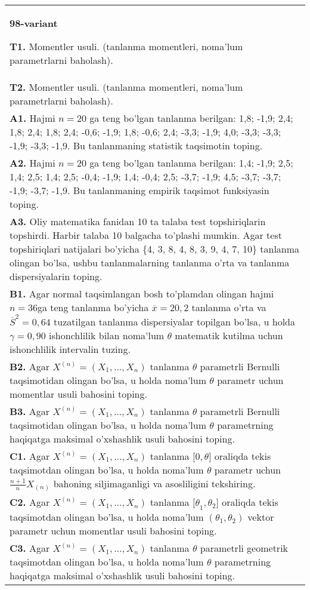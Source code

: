 \documentclass{article}
\begin{document}
\begin{tabular}{m{17cm}}
\textbf{98-variant}
\newline

\textbf{T1.} 
Momentler usuli. (tanlanma momentleri, noma'lum parametrlarni baholash).
\\
\textbf{T2.} 
Momentler usuli. (tanlanma momentleri, noma'lum parametrlarni baholash).
\\
\textbf{A1.} 
Hajmi \(n = 20\) ga teng bo'lgan tanlanma berilgan: 1,8; -1,9; 2,4; 1,8; 2,4; 1,8; 2,4; -0,6; -1,9; 1,8; -0,6; 2,4; -3,3; -1,9; 4,0; -3,3; -3,3; -1,9; -3,3; -1,9. Bu tanlanmaning statistik taqsimotin toping.
\\
\textbf{A2.} 
Hajmi \(n = 20\) ga teng bo'lgan tanlanma berilgan: 1,4; -1,9; 2,5; 1,4; 2,5; 1,4; 2,5; -0,4; -1,9; 1,4; -0,4; 2,5; -3,7; -1,9; 4,5; -3,7; -3,7; -1,9; -3,7; -1,9. Bu tanlanmaning empirik taqsimot funksiyasin toping.
\\
\textbf{A3.} 
Oliy matematika fanidan 10 ta talaba test topshiriqlarin topshirdi. Harbir talaba 10 balgacha to'plashi mumkin. Agar test topshiriqlari natijalari bo'yicha \{4, 3, 8, 4, 8, 3, 9, 4, 7, 10\} tanlanma olingan bo'lsa, ushbu tanlanmalarning tanlanma o'rta va tanlanma dispersiyalarin toping.
\\
\textbf{B1.} 
Agar normal taqsimlangan bosh to'plamdan olingan hajmi \(n = 36\)ga teng tanlanma bo'yicha \(\overline{x} = 20,2\) tanlanma o'rta va \({\overline{S}}^{2} = 0,64\) tuzatilgan tanlanma dispersiyalar topilgan bo'lsa, u holda \(\gamma = 0,90\) ishonchlilik bilan noma'lum \(\theta\) matematik kutilma uchun ishonchlilik intervalin tuzing.
\\
\textbf{B2.} 
Agar \(X^{(n)} = \left( X_{1},...,X_{n} \right)\) tanlanma \(\theta\) parametrli Bernulli taqsimotidan olingan bo'lsa, u holda noma'lum \(\theta\) parametr uchun momentlar usuli bahosini toping.
\\
\textbf{B3.} 
Agar \(X^{(n)} = \left( X_{1},...,X_{n} \right)\) tanlanma \(\theta\) parametrli Bernulli taqsimotidan olingan bo'lsa, u holda noma'lum \(\theta\) parametrning haqiqatga maksimal o'xshashlik usuli bahosini toping.
\\
\textbf{C1.} 
Agar \(X^{(n)} = \left( X_{1},...,X_{n} \right)\) tanlanma \(\lbrack 0,\theta\rbrack\) oraliqda tekis taqsimotdan olingan bo'lsa, u holda noma'lum \(\theta\) parametr uchun \(\frac{n + 1}{n}X_{(n)}\) bahoning siljimaganligi va asosliligini tekshiring.
\\
\textbf{C2.} 
Agar \(X^{(n)} = \left( X_{1},...,X_{n} \right)\) tanlanma \({\lbrack\theta}_{1},\theta_{2}\rbrack\) oraliqda tekis taqsimotdan olingan bo'lsa, u holda noma'lum \(\left( \theta_{1},\theta_{2} \right)\) vektor parametr uchun momentlar usuli bahosini toping.
\\
\textbf{C3.} 
Agar \(X^{(n)} = \left( X_{1},...,X_{n} \right)\) tanlanma \(\theta\) parametrli geometrik taqsimotdan olingan bo'lsa, u holda noma'lum \(\theta\) parametrning haqiqatga maksimal o'xshashlik usuli bahosini toping.
\\

\end{tabular}
\vspace{1cm}
\end{document}
